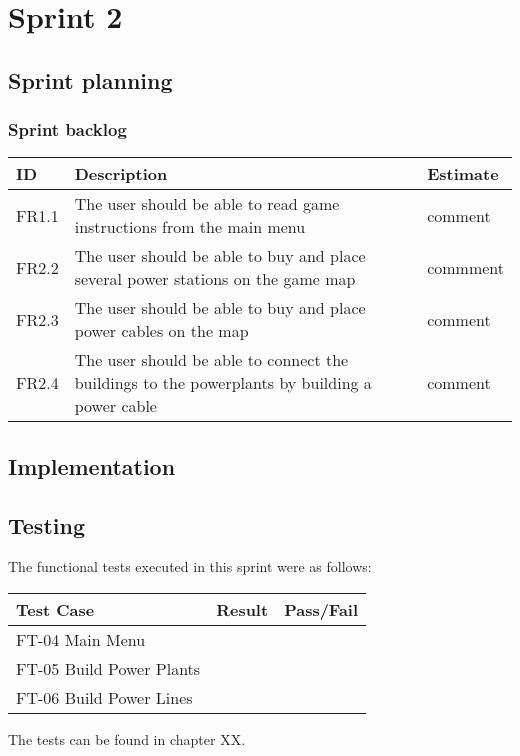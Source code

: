 \section{Sprint 2}

\subsection{Sprint planning}
\subsubsection{Sprint backlog}
\begin{tabular}{| p{1cm} | p{8cm} | p{3cm} |}
	\hline
	ID & Description & Estimate \\ \hline
	FR1.1 & The user should be able to read game instructions from the main menu & comment \\ \hline
	FR2.2 & The user should be able to buy and place several power stations on the game map 
	& commment \\ \hline
	FR2.3 & The user should be able to buy and place power cables on the map & comment \\ \hline
	FR2.4 & The user should be able to connect the buildings to the powerplants by 
	building a power cable & comment \\ \hline
\end{tabular}
\subsection{Implementation}


\subsection{Testing}

The functional tests executed in this sprint were as follows:


\begin{tabular}{| l | l | l |}
	\hline
	\rowcolor{lightgray}
	{\bf Test Case} & {\bf Result} & {\bf Pass/Fail} \\ \hline
  	FT-04 Main Menu & & \\ \hline
	FT-05 Build Power Plants & & \\ \hline
	FT-06 Build Power Lines & & \\ \hline
\end{tabular}

The tests can be found in chapter XX.

